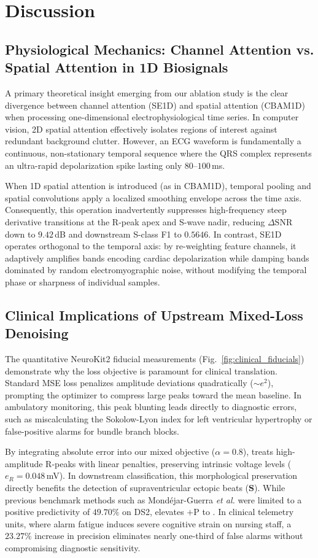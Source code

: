 \section{Discussion}
\label{sec:discussion}

\subsection{Physiological Mechanics: Channel Attention vs. Spatial Attention in 1D Biosignals}
A primary theoretical insight emerging from our ablation study is the clear divergence between channel attention (SE1D) and spatial attention (CBAM1D) when processing one-dimensional electrophysiological time series. In computer vision, 2D spatial attention effectively isolates regions of interest against redundant background clutter. However, an ECG waveform is fundamentally a continuous, non-stationary temporal sequence where the QRS complex represents an ultra-rapid depolarization spike lasting only $80$--$100$\,ms.

When 1D spatial attention is introduced (as in CBAM1D), temporal pooling and spatial convolutions apply a localized smoothing envelope across the time axis. Consequently, this operation inadvertently suppresses high-frequency steep derivative transitions at the R-peak apex and S-wave nadir, reducing $\Delta\mathrm{SNR}$ down to $9.42$\,dB and downstream S-class F1 to $0.5646$. In contrast, SE1D operates orthogonal to the temporal axis: by re-weighting feature channels, it adaptively amplifies bands encoding cardiac depolarization while damping bands dominated by random electromyographic noise, without modifying the temporal phase or sharpness of individual samples.

\subsection{Clinical Implications of Upstream Mixed-Loss Denoising}
The quantitative NeuroKit2 fiducial measurements (Fig.~\ref{fig:clinical_fiducials}) demonstrate why the loss objective is paramount for clinical translation. Standard MSE loss penalizes amplitude deviations quadratically ($\sim e^2$), prompting the optimizer to compress large peaks toward the mean baseline. In ambulatory monitoring, this peak blunting leads directly to diagnostic errors, such as miscalculating the Sokolow-Lyon index for left ventricular hypertrophy or false-positive alarms for bundle branch blocks.

By integrating absolute error into our mixed objective ($\alpha=0.8$), \HSL{} treats high-amplitude R-peaks with linear penalties, preserving intrinsic voltage levels ($e_R = 0.048$\,mV). In downstream classification, this morphological preservation directly benefits the detection of supraventricular ectopic beats ($\mathbf{S}$). While previous benchmark methods such as Mond{\'e}jar-Guerra \emph{et al.} \cite{mondejar2019} were limited to a positive predictivity of $49.70\%$ on DS2, \RRN{} elevates $+\mathrm{P}$ to . In clinical telemetry units, where alarm fatigue induces severe cognitive strain on nursing staff, a $23.27\%$ increase in precision eliminates nearly one-third of false alarms without compromising diagnostic sensitivity.

